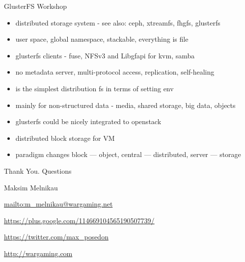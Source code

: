 \documentclass[aspectratio=169]{beamer}
\begin{document}
\begin{frame}{GlusterFS Workshop}
  \begin{itemize}
  \item distributed storage system - see also: ceph, xtreamfs, fhgfs, glusterfs
  \item user space, global namespace, stackable, everything is file
  \item glusterfs clients - fuse, NFSv3 and Libgfapi for kvm, samba
  \item no metadata server, multi-protocol access, replication, self-healing
  \item is the simplest distribution fs in terms of setting env
  \item mainly for non-structured data - media, shared storage, big data, objects
  \item glusterfs could be nicely integrated to openstack
  \item distributed block storage for VM
  \item paradigm changes block --- object, central --- distributed, server --- storage
  \end{itemize}
\end{frame}

{

\begin{frame}{Thank You. Questions}
    \begin{block}{Maksim Melnikau}
    \par \url{mailto:m\_melnikau@wargaming.net}
    \par \url{https://plus.google.com/114669104565190507739/}
    \par \url{https://twitter.com/max\_posedon}
    \par \url{http://wargaming.com}
    \end{block}
\end{frame}
}
\end{document}
